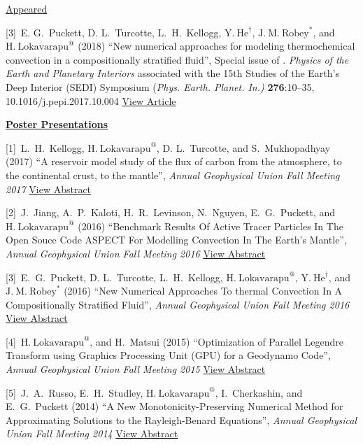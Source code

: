 \documentclass[11pt]{ltxdoc}
\begin{document}
\noindent
\underline{Appeared}

\vskip 06pt

\hangindent 20pt
[3]~E. G.~Puckett, D. L.~Turcotte, L.~H.~Kellogg,  $\mathrm{Y.~He}^{\dagger}$, $\mathrm{J.~M.~Robey}^{*}$, and 
$\mathrm{H.~Lokavarapu}^{@}$ (2018)
``New numerical approaches for modeling thermochemical convection in a compositionally stratified fluid'', 
Special issue of . \textit{Physics of the Earth and Planetary Interiors} associated with the 15th Studies of the Earth's Deep Interior (SEDI) Symposium (\textit{Phys. Earth. Planet. In.)} \textbf{276}:10–35, 10.1016/j.pepi.2017.10.004
\href{https://www.math.ucdavis.edu/~egp/PUBLICATIONS/JOURNAL_ARTICLES/APPEARED/2018/EGP-DLT-YH-HL-JMR-LHK-2018.pdf}{View Article}

\noindent
\textbf{\underline{Poster Presentations}}


\hangindent 20pt
[1]~L.~H.~Kellogg, $\mathrm{H.~Lokavarapu}^{@}$, D. L.~Turcotte, and S.~Mukhopadhyay (2017) 
``A reservoir model study of the flux of carbon from the atmosphere, to the continental crust, to the mantle'', 
\textit{Annual Geophysical Union Fall Meeting 2017}
\href{http://adsabs.harvard.edu/abs/2017AGUFMDI14A..06K}{View Abstract}

\hangindent 20pt
[2]~J.~Jiang, A.~P.~Kaloti, H.~R.~Levinson, N.~Nguyen, E.~G.~Puckett, and $\mathrm{H.~Lokavarapu}^{@}$ (2016) 
``Benchmark Results Of Active Tracer Particles In The Open Souce Code ASPECT For Modelling Convection In The Earth's Mantle'', 
\textit{Annual Geophysical Union Fall Meeting 2016}
\href{http://adsabs.harvard.edu/abs/2016AGUFM.T23C2946J}{View Abstract}

\hangindent 20pt
[3]~E.~G.~Puckett, D. L.~Turcotte, L.~H.~Kellogg, $\mathrm{H.~Lokavarapu}^{@}$,  $\mathrm{Y.~He}^{\dagger}$, and $\mathrm{J.~M.~Robey}^{*}$ (2016) 
``New Numerical Approaches To thermal Convection In A Compositionally Stratified Fluid'', 
\textit{Annual Geophysical Union Fall Meeting 2016}
\href{http://adsabs.harvard.edu/abs/2016AGUFMDI23A2589P}{View Abstract}

\hangindent 20pt
[4]~$\mathrm{H.~Lokavarapu}^{@}$, and H.~Matsui (2015) 
``Optimization of Parallel Legendre Transform using Graphics Processing Unit (GPU) for a Geodynamo Code'', 
\textit{Annual Geophysical Union Fall Meeting 2015}
\href{http://adsabs.harvard.edu/abs/2015AGUFMGP43B1253L}{View Abstract}

\hangindent 20pt
[5]~J.~A.~Russo, E.~H.~Studley, $\mathrm{H.~Lokavarapu}^{@}$, I.~Cherkashin, and E.~G.~Puckett (2014) 
``A New Monotonicity-Preserving Numerical Method for Approximating Solutions to the Rayleigh-Benard Equations'', 
\textit{Annual Geophysical Union Fall Meeting 2014}
\href{http://adsabs.harvard.edu/abs/2014AGUFMDI11A4258R}{View Abstract}
\end{document}
